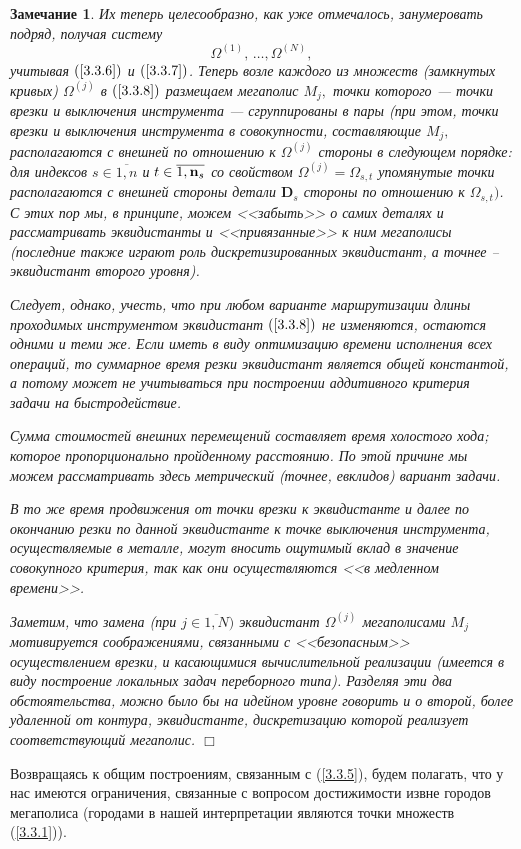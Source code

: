 \documentclass[11pt,twoside,openany]{report}
\newcommand{\bmn}{{\bf n}}
\newcommand{\bfn}{\begin{equation}}
\newcommand{\efn}{\end{equation}}
\newcommand{\ov}{\overline}
\newcounter{theo}
\newcounter{zam}
\newtheorem{zam}{Замечание}[section]
\newcommand{\Om}{\Omega}
\begin{document}
\begin{zam}
Их теперь целесообразно, как уже отмечалось, занумеровать подряд, получая систему
\bfn
  \label{3.3.8}
  \Om^{(1)},\,\ldots,\Om^{(N)}
  ,
\efn
учитывая
$(\ref{3.3.6})$ и $(\ref{3.3.7})$.
Теперь возле каждого из множеств
(замкнутых кривых)
$\Om^{(j)}$ в $(\ref{3.3.8})$
размещаем мегаполис $M_j,$
точки которого --- точки врезки и выключения инструмента --- сгруппированы в пары
(при этом, точки врезки и выключения инструмента в совокупности,
составляющие $M_j,$
располагаются с внешней по отношению к $\Om^{(j)}$ стороны в следующем порядке:
для индексов
$s\in \ov{1,n}$ и $t\in \ov{1,\bmn_s}$
со свойством $\Om^{(j)} = \Om_{s,t}$
упомянутые точки располагаются с внешней
стороны детали
$\mathbf{D}_s$ стороны по
отношению к $\Om_{s,t})$.
С этих пор мы, в принципе, можем <<забыть>> о самих деталях
и рассматривать эквидистанты и <<привязанные>> к ним мегаполисы
(последние также играют
роль дискретизированных эквидистант,
а точнее -- эквидистант второго уровня).

Следует, однако, учесть,
что при любом варианте маршрутизации длины проходимых
инструментом эквидистант $(\ref{3.3.8})$
не изменяются, остаются одними и теми же.
Если иметь в виду оптимизацию времени исполнения всех операций,
то суммарное время
резки эквидистант является общей константой,
а потому может не учитываться  при
построении аддитивного критерия задачи на быстродействие.

Сумма стоимостей внешних перемещений составляет время холостого хода;
которое пропорционально пройденному расстоянию.
По этой причине мы можем рассматривать
здесь метрический
(точнее, евклидов) вариант задачи.

В то же время продвижения от точки врезки к эквидистанте и далее
по окончанию резки по данной эквидистанте
к точке выключения инструмента, осуществляемые в металле,
могут вносить ощутимый вклад в значение совокупного критерия,
так как они осуществляются <<в медленном времени>>.

Заметим, что замена (при $j\in \ov{1,N})$ эквидистант $\Om^{(j)}$
мегаполисами
$M_j$
мотивируется соображениями, связанными с <<безопасным>> осуществлением врезки,
и касающимися вычислительной реализации
(имеется в виду построение локальных задач переборного типа).
Разделяя эти два обстоятельства,
можно было бы на идейном уровне говорить и о второй,
более удаленной от контура, эквидистанте,
дискретизацию которой реализует соответствующий мегаполис.
\hfill $\Box$
\end{zam}

Возвращаясь к общим построениям,
связанным с (\ref{3.3.5}),
будем полагать, что
у нас имеются ограничения, связанные с вопросом достижимости извне городов
мегаполиса
(городами в нашей интерпретации являются точки множеств (\ref{3.3.1})).
\end{document}

